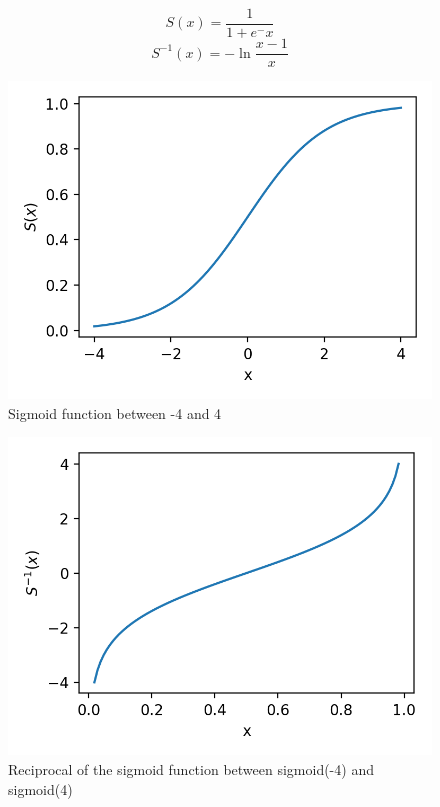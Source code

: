 \begin{equation}
  \label{eq:sigmoid}
  S(x) = \frac{1}{1+e^-x}
\end{equation}
\begin{equation}
  \label{eq:sigmoid_r}
  S^{-1}(x) = -\ln{\frac{x-1}{x}}
\end{equation}

\begin{figure}
  \includegraphics[width=\linewidth]{img/sigmoid.png}
  \caption{Sigmoid function between -4 and 4}
  \label{fig:sigmoid}
\end{figure}
\begin{figure}
  \includegraphics[width=\linewidth]{img/sigmoid_r.png}
  \caption{Reciprocal of the sigmoid function between sigmoid(-4) and sigmoid(4)}
  \label{fig:sigmoid_r}
\end{figure}

